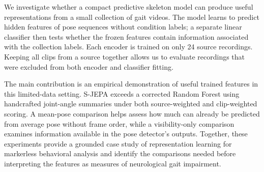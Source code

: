 We investigate whether a compact predictive skeleton model can produce useful representations from a small collection of gait videos. The model learns to predict hidden features of pose sequences without condition labels; a separate linear classifier then tests whether the frozen features contain information associated with the collection labels. Each encoder is trained on only 24 source recordings. Keeping all clips from a source together allows us to evaluate recordings that were excluded from both encoder and classifier fitting.

The main contribution is an empirical demonstration of useful trained features in this limited-data setting. S-JEPA exceeds a corrected Random Forest using handcrafted joint-angle summaries under both source-weighted and clip-weighted scoring. A mean-pose comparison helps assess how much can already be predicted from average pose without frame order, while a visibility-only comparison examines information available in the pose detector's outputs. Together, these experiments provide a grounded case study of representation learning for markerless behavioral analysis and identify the comparisons needed before interpreting the features as measures of neurological gait impairment.
